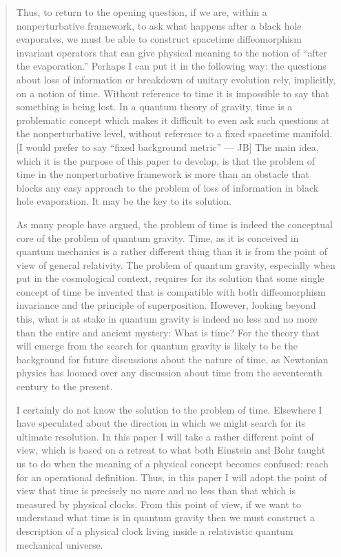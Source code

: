 \documentclass[12pt]{article}
\begin{document}
\begin{quote}

Thus, to return to the opening question, if we are, within a
nonperturbative framework, to ask what happens after a black hole
evaporates, we must be able to construct spacetime diffeomorphism
invariant operators that can give physical meaning to the notion of
``after the evaporation.'' Perhaps I can put it in the following way:
the questions about loss of information or breakdown of unitary
evolution rely, implicitly, on a notion of time. Without reference to
time it is impossible to say that something is being lost. In a quantum
theory of gravity, time is a problematic concept which makes it
difficult to even ask such questions at the nonperturbative level,
without reference to a fixed spacetime manifold. {[}I would prefer to
say ``fixed background metric'' --- JB{]} The main idea, which it is the
purpose of this paper to develop, is that the problem of time in the
nonperturbative framework is more than an obstacle that blocks any easy
approach to the problem of loss of information in black hole
evaporation. It may be the key to its solution.

As many people have argued, the problem of time is indeed the conceptual
core of the problem of quantum gravity. Time, as it is conceived in
quantum mechanics is a rather different thing than it is from the point
of view of general relativity. The problem of quantum gravity,
especially when put in the cosmological context, requires for its
solution that some single concept of time be invented that is compatible
with both diffeomorphism invariance and the principle of superposition.
However, looking beyond this, what is at stake in quantum gravity is
indeed no less and no more than the entire and ancient mystery: What is
time? For the theory that will emerge from the search for quantum
gravity is likely to be the background for future discussions about the
nature of time, as Newtonian physics has loomed over any discussion
about time from the seventeenth century to the present.

I certainly do not know the solution to the problem of time. Elsewhere I
have speculated about the direction in which we might search for its
ultimate resolution. In this paper I will take a rather different point
of view, which is based on a retreat to what both Einstein and Bohr
taught us to do when the meaning of a physical concept becomes confused:
reach for an operational definition. Thus, in this paper I will adopt
the point of view that time is precisely no more and no less than that
which is measured by physical clocks. From this point of view, if we
want to understand what time is in quantum gravity then we must
construct a description of a physical clock living inside a relativistic
quantum mechanical universe.

\end{quote}
\end{document}
